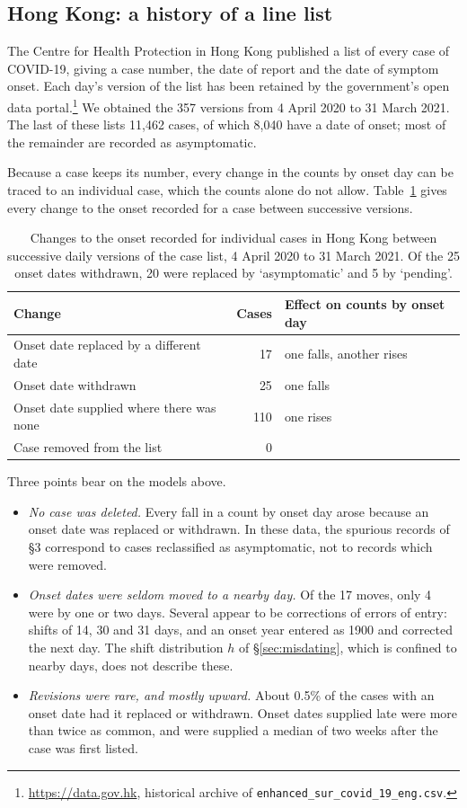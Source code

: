 \documentclass[11pt,a4paper]{article}
\begin{document}
\subsection{Hong Kong: a history of a line list}

The Centre for Health Protection in Hong Kong published a list of every case
of COVID-19, giving a case number, the date of report and the date of symptom
onset. Each day's version of the list has been retained by the government's
open data portal.\footnote{\url{https://data.gov.hk}, historical archive of
\texttt{enhanced\_sur\_covid\_19\_eng.csv}.} We obtained the 357 versions from
4 April 2020 to 31 March 2021. The last of these lists 11{,}462 cases, of which
8{,}040 have a date of onset; most of the remainder are recorded as
asymptomatic.

Because a case keeps its number, every change in the counts by onset day can
be traced to an individual case, which the counts alone do not allow.
Table~\ref{tab:hongkong} gives every change to the onset recorded for a case
between successive versions.

\begin{table}[h]
\centering
\begin{tabular}{lrl}
\toprule
Change & Cases & Effect on counts by onset day \\
\midrule
Onset date replaced by a different date & 17 & one falls, another rises \\
Onset date withdrawn & 25 & one falls \\
Onset date supplied where there was none & 110 & one rises \\
Case removed from the list & 0 & \\
\bottomrule
\end{tabular}
\caption{Changes to the onset recorded for individual cases in Hong Kong
between successive daily versions of the case list, 4 April 2020 to 31 March
2021. Of the 25 onset dates withdrawn, 20 were replaced by `asymptomatic' and
5 by `pending'.}
\label{tab:hongkong}
\end{table}

Three points bear on the models above.
\begin{itemize}[itemsep=2pt]
\item \emph{No case was deleted.} Every fall in a count by onset day arose
because an onset date was replaced or withdrawn. In these data, the spurious
records of \S3 correspond to cases reclassified as asymptomatic, not to
records which were removed.
\item \emph{Onset dates were seldom moved to a nearby day.} Of the 17 moves,
only 4 were by one or two days. Several appear to be corrections of errors of
entry: shifts of 14, 30 and 31 days, and an onset year entered as 1900 and
corrected the next day. The shift distribution $h$ of \S\ref{sec:misdating},
which is confined to nearby days, does not describe these.
\item \emph{Revisions were rare, and mostly upward.} About 0.5\% of the cases
with an onset date had it replaced or withdrawn. Onset dates supplied late were
more than twice as common, and were supplied a median of two weeks after the
case was first listed.
\end{itemize}
\end{document}
